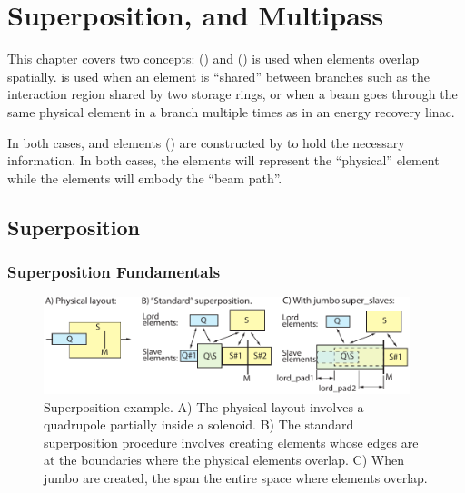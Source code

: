 \chapter{Superposition, and Multipass}
\label{c:super.multi}

This chapter covers two concepts:  () and 
()  is used when elements overlap spatially.   is
used when an element is ``shared'' between branches such as the interaction region shared by two
storage rings, or when a beam goes through the same physical element in a branch multiple times as
in an energy recovery linac.

In both cases,  and  elements () are constructed by \bmad to
hold the necessary information. In both cases, the  elements will represent the
``physical'' element while the  elements will embody the ``beam path''.

\section{Superposition}
\label{s:super}

\subsection{Superposition Fundamentals}
\label{s:super.fund}

  \begin{figure}[tb]
  \centering 
  \includegraphics[width=0.95\textwidth]{superimpose-example.pdf} 
  \caption[Superposition example.]
{Superposition example. A) The physical layout involves a quadrupole partially inside a solenoid. B)
The standard superposition procedure involves creating  elements whose edges are at
the boundaries where the physical elements overlap. C) When jumbo  are created, the
 span the entire space where elements overlap.}
  \label{f:super.ex}
  \end{figure}

